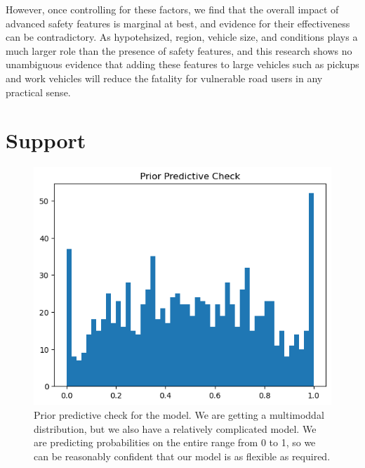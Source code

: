 \documentclass[12pt]{article}
\begin{document}
However, once controlling for these factors, we find that the overall impact
of advanced safety features is marginal at best, and evidence for their effectiveness
can be contradictory. As hypotehsized, region, vehicle size, and conditions plays a much 
larger role than the presence of safety features, and this research shows no unambiguous 
evidence that adding these features to large vehicles such as pickups and work vehicles 
will reduce the fatality for vulnerable road users in any practical sense.

\section{Support}

\begin{figure}[h]
    \centering
    \includegraphics[width=\textwidth]{images/prior_predictive_check.png}
    \caption{Prior predictive check for the model. We are getting a multimoddal distribution, but we 
    also have a relatively complicated model. We are predicting probabilities on the entire
    range from 0 to 1, so we can be reasonably confident that our model is as flexible as required.}
    \label{fig:ppc}
\end{figure}
\end{document}
